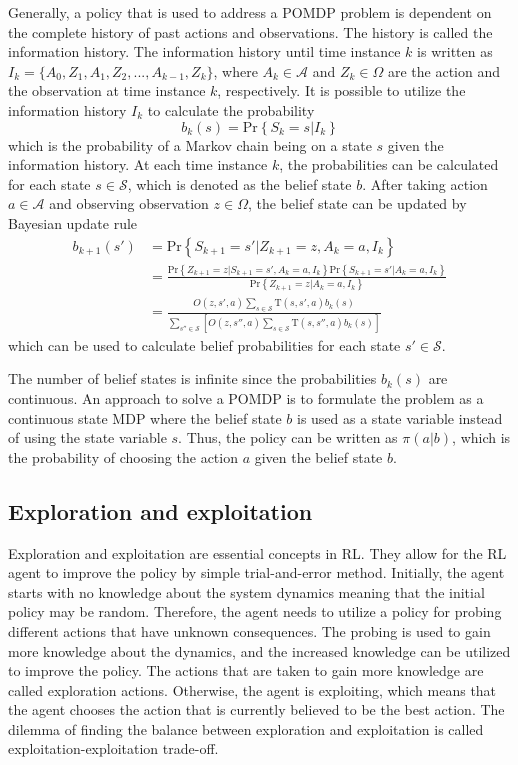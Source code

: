 \documentclass[english, 12pt, a4paper, elec, utf8, a-1b, online]{aaltothesis}
\newcommand{\Ss}{\mathcal{S}}
\newcommand{\As}{\mathcal{A}}
\newcommand{\Os}{\Omega}
\newcommand{\Op}{O}
\renewcommand{\Pr}[1]{\text{Pr}\left\{ #1 \right\}}
\begin{document}
Generally, a policy that is used to address a POMDP problem is dependent on the complete history of past actions and observations. 
The history is called the information history.
The information history until time instance $k$ is written as $I_k=\{A_0, Z_1, A_1, Z_2, ..., A_{k-1}, Z_{k}\}$, where $A_k \in \As$ and $Z_k \in \Os$ are the action and the observation at time instance $k$, respectively.
It is possible to utilize the information history $I_k$ to calculate the probability
\begin{equation}
    b_k(s) = \Pr{S_k=s|I_k}
\end{equation}
which is the probability of a Markov chain being on a state $s$ given the information history.
At each time instance $k$, the probabilities can be calculated for each state $s \in \Ss$, which is denoted as the belief state $b$.
After taking action $a \in \As$ and observing observation $z \in \Os$, the belief state can be updated by Bayesian update rule \cite{Krishnamurthy2016}
\begin{align}
    b_{k+1}(s') 
    &= \Pr{S_{k+1}=s' | Z_{k+1}=z, A_k=a, I_k} \\
    &= \frac
        {\Pr{Z_{k+1}=z | S_{k+1}=s' , A_k=a, I_k} \Pr{S_{k+1}=s'| A_k=a, I_k}}
        {\Pr{Z_{k+1}=z | A_k=a, I_k}} \\
    &= \frac
        {\Op(z, s', a) \sum_{s \in \Ss} \mathrm{T}(s, s', a) b_k(s)}
        {\sum_{s''  \in \Ss} \left[ 
            \Op(z, s'', a) \sum_{s \in \Ss} \mathrm{T}(s, s'', a) b_k(s) \right]}  \label{eq:belief_state_update}
\end{align}
which can be used to calculate belief probabilities for each state $s' \in \Ss$.

The number of belief states is infinite since the probabilities $b_k(s)$ are continuous.
An approach to solve a POMDP is to formulate the problem as a continuous state MDP where the belief state $b$ is used as a state variable instead of using the state variable $s$.
Thus, the policy can be written as $\pi(a | b)$, which is the probability of choosing the action $a$ given the belief state $b$.

\subsection{Exploration and exploitation}\label{sec:exp_exp}

Exploration and exploitation are essential concepts in RL. 
They allow for the RL agent to improve the policy by simple trial-and-error method.
Initially, the agent starts with no knowledge about the system dynamics meaning that the initial policy may be random.
Therefore, the agent needs to utilize a policy for probing different actions that have unknown consequences.
The probing is used to gain more knowledge about the dynamics, and the increased knowledge can be utilized to improve the policy.
The actions that are taken to gain more knowledge are called exploration actions.
Otherwise, the agent is exploiting, which means that the agent chooses the action that is currently believed to be the best action.
The dilemma of finding the balance between exploration and exploitation is called exploitation-exploitation trade-off.
\end{document}

